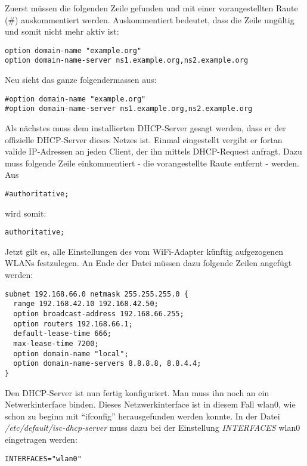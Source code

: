 Zuerst müssen die folgenden Zeile gefunden und mit einer vorangestellten Raute (\#) auskommentiert werden. Auskommentiert bedeutet, dass die Zeile ungültig und somit nicht mehr aktiv ist:

\begin{lstlisting}
option domain-name "example.org"
option domain-name-server ns1.example.org,ns2.example.org
\end{lstlisting}

Neu sieht das ganze folgendermassen aus:

\begin{lstlisting}
#option domain-name "example.org"
#option domain-name-server ns1.example.org,ns2.example.org
\end{lstlisting}

Als nächstes muss dem installierten DHCP-Server gesagt werden, dass er der offizielle DHCP-Server dieses Netzes ist. Einmal eingestellt vergibt er fortan valide IP-Adressen an jeden Client, der ihn mittels DHCP-Request anfragt.
Dazu muss folgende Zeile einkommentiert - die vorangestellte Raute entfernt - werden. Aus

\begin{lstlisting}
#authoritative;
\end{lstlisting}

wird somit:

\begin{lstlisting}
authoritative;
\end{lstlisting}

Jetzt gilt es, alle Einstellungen des vom WiFi-Adapter künftig aufgezogenen WLANs festzulegen. 
An Ende der Datei müssen dazu folgende Zeilen angefügt werden:

\begin{lstlisting}
subnet 192.168.66.0 netmask 255.255.255.0 {
  range 192.168.42.10 192.168.42.50;
  option broadcast-address 192.168.66.255;
  option routers 192.168.66.1;
  default-lease-time 666;
  max-lease-time 7200;
  option domain-name "local";
  option domain-name-servers 8.8.8.8, 8.8.4.4;
}
\end{lstlisting}

Den DHCP-Server ist nun fertig konfiguriert. Man muss ihn noch an ein Netwerkinterface binden. Dieses Netzwerkinterface ist in diesem Fall wlan0, wie schon zu beginn mit ``ifconfig'' herausgefunden werden konnte.
In der Datei \textit{/etc/default/isc-dhcp-server} muss dazu bei der Einstellung \textit{INTERFACES} wlan0 eingetragen werden:

\begin{lstlisting}
INTERFACES="wlan0"
\end{lstlisting}

